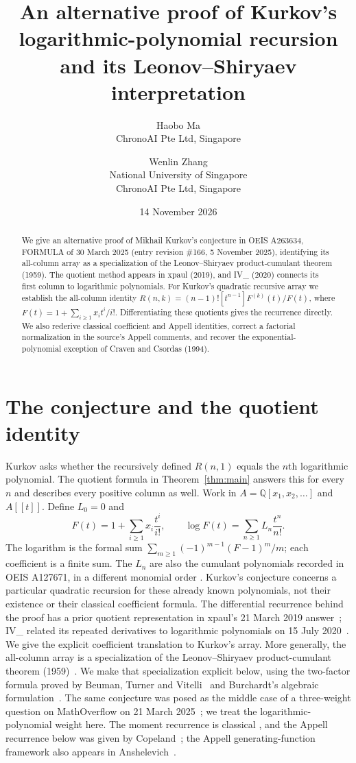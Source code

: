 \documentclass[11pt]{article}
\title{An alternative proof of Kurkov's logarithmic-polynomial recursion
and its Leonov--Shiryaev interpretation}
\author{Haobo Ma\\\small ChronoAI Pte Ltd, Singapore
\and Wenlin Zhang\\\small National University of Singapore\\\small ChronoAI Pte Ltd, Singapore}
\date{14 November 2026}
\newcommand{\Q}{\mathbb Q}
\begin{document}
\maketitle
\begin{abstract}
We give an alternative proof of Mikhail Kurkov's conjecture in OEIS A263634, FORMULA of
30 March 2025 (entry revision \#166, 5 November 2025), identifying its
all-column array as a specialization of the Leonov--Shiryaev
product-cumulant theorem (1959).
The quotient method appears in xpaul (2019), and IV\_ (2020)
connects its first column to logarithmic polynomials.
For Kurkov's quadratic recursive array we establish the all-column identity
$R(n,k)=(n-1)![t^{n-1}]F^{(k)}(t)/F(t)$, where
$F(t)=1+\sum_{i\geq1}x_it^i/i!$.
Differentiating these quotients gives the recurrence directly.
We also rederive classical coefficient and Appell identities, correct a
factorial normalization in the source's Appell comments, and recover
the exponential-polynomial exception of Craven and Csordas (1994).
\end{abstract}

\section{The conjecture and the quotient identity}
Kurkov asks whether the recursively defined $R(n,1)$ equals the $n$th
logarithmic polynomial. The quotient formula in Theorem~\ref{thm:main}
answers this for every $n$ and describes every positive column as well.
Work in $A=\Q[x_1,x_2,\ldots]$ and $A[[t]]$. Define $L_0=0$ and
\begin{equation}\label{eq:log}
 F(t)=1+\sum_{i\geq1}x_i\frac{t^i}{i!},\qquad
 \log F(t)=\sum_{n\geq1}L_n\frac{t^n}{n!}.
\end{equation}
The logarithm is the formal sum $\sum_{m\geq1}(-1)^{m-1}(F-1)^m/m$;
each coefficient is a finite sum. The $L_n$ are also the cumulant
polynomials recorded in OEIS A127671, in a different monomial order
\cite{oeis,oeis127671}. Kurkov's conjecture concerns a particular
quadratic recursion for these already known polynomials, not their
existence or their classical coefficient formula.
The differential recurrence behind the proof has a prior quotient
representation in xpaul's 21 March 2019 answer~\cite{xpaul};
IV\_ related its repeated derivatives to logarithmic polynomials
on 15 July 2020~\cite{iv}. We give the explicit coefficient translation
to Kurkov's array. More generally, the all-column array is a specialization
of the Leonov--Shiryaev product-cumulant theorem (1959)~\cite{ls}.
We make that specialization explicit below, using the two-factor formula
proved by Beuman, Turner and Vitelli~\cite[Appendix A, (A10)--(A15)]{btv}
and Burchardt's algebraic formulation~\cite[Section 1.2, Theorem 1.9]{burchardt}.
The same conjecture was posed as the middle case of a three-weight
question on MathOverflow on 21 March 2025~\cite{mo}; we treat the
logarithmic-polynomial weight here.
The moment recurrence is classical
\cite[Section 1.2, p.~4]{novak}, and the Appell recurrence below
was given by Copeland~\cite[Part II, p.~3]{copeland}; the Appell
generating-function framework also appears in
Anshelevich~\cite[Section 1, (1); Section 2.2]{anshelevich}.
\end{document}
